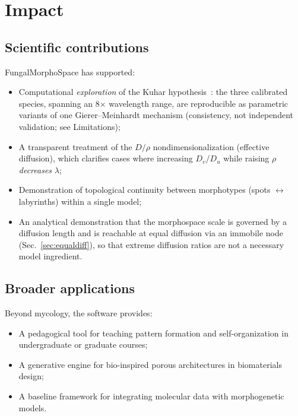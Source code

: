 \documentclass[review,3p]{elsarticle}
\begin{document}
\section{Impact}
\label{sec:impact}

\subsection{Scientific contributions}

FungalMorphoSpace has supported:
\begin{itemize}
  \item Computational \emph{exploration} of the Kuhar
    hypothesis~\cite{kuhar2022}: the three calibrated species, spanning an
    8$\times$ wavelength range, are reproducible as parametric variants of
    one Gierer--Meinhardt mechanism (consistency, not independent
    validation; see Limitations);
  \item A transparent treatment of the $D/\rho$ nondimensionalization
    (effective diffusion), which clarifies cases where increasing
    $D_v/D_u$ while raising $\rho$ \emph{decreases} $\lambda$;
  \item Demonstration of topological continuity between morphotypes
    (spots $\leftrightarrow$ labyrinths) within a single model;
  \item An analytical demonstration that the morphospace scale is governed
    by a diffusion length and is reachable at equal diffusion via an
    immobile node (Sec.~\ref{sec:equaldiff}), so that extreme
    diffusion ratios are not a necessary model ingredient.
\end{itemize}

\subsection{Broader applications}

Beyond mycology, the software provides:
\begin{itemize}
  \item A pedagogical tool for teaching pattern formation and
    self-organization in undergraduate or graduate courses;
  \item A generative engine for bio-inspired porous architectures
    in biomaterials design;
  \item A baseline framework for integrating molecular data with
    morphogenetic models.
\end{itemize}
\end{document}
